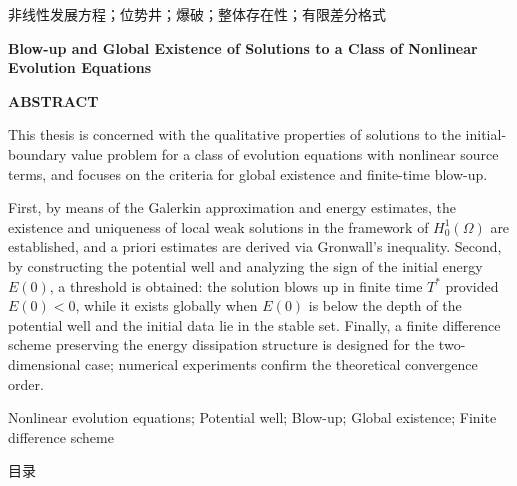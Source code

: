 \documentclass[12pt,a4paper,twoside,openright]{ctexbook}
\makeatletter
\newcommand{\thesisTitleE}{Blow-up and Global Existence of Solutions to a Class of Nonlinear Evolution Equations} %
\numberwithin{figure}{chapter}
\numberwithin{table}{chapter}
\numberwithin{equation}{chapter}
\theoremstyle{ncwuthm}
\renewcommand\tableofcontents{\@starttoc{toc}}
\renewcommand{\contentsname}{目\hspace{0.6em}录}
\makeatother
\begin{document}
\vspace{0.6cm}
\songti 非线性发展方程；位势井；爆破；整体存在性；有限差分格式

\clearpage

\begin{center}
  {\bfseries\thesisTitleE\par}
  \vspace{0.8cm}
  {\bfseries ABSTRACT\par}
\end{center}
\vspace{0.4cm}

\songti
This thesis is concerned with the qualitative properties of solutions to the initial-boundary value problem for a class of evolution equations with nonlinear source terms, and focuses on the criteria for global existence and finite-time blow-up. \par

First, by means of the Galerkin approximation and energy estimates, the existence and uniqueness of local weak solutions in the framework of $H^1_0(\Omega)$ are established, and a priori estimates are derived via Gronwall's inequality. Second, by constructing the potential well and analyzing the sign of the initial energy $E(0)$, a threshold is obtained: the solution blows up in finite time $T^*$ provided $E(0)<0$, while it exists globally when $E(0)$ is below the depth of the potential well and the initial data lie in the stable set. Finally, a finite difference scheme preserving the energy dissipation structure is designed for the two-dimensional case; numerical experiments confirm the theoretical convergence order. \par

\vspace{0.6cm}
\normalfont{}\songti Nonlinear evolution equations; Potential well; Blow-up; Global existence; Finite difference scheme

\clearpage

\begin{center}
  {\heiti\contentsname\par}
\end{center}
\markboth{\contentsname}{\contentsname}
\addcontentsline{toc}{chapter}{\contentsname}
\vspace{0.3cm}
\tableofcontents
\thispagestyle{ncwupage}
\clearpage
\end{document}
